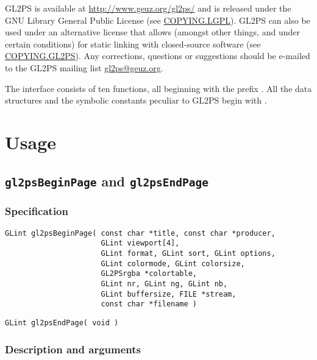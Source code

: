 \documentclass[10pt]{article}
\newcommand{\dd}{\begingroup\Url}
\newcommand{\email}[2]{\href{mailto:#2}{#1}}
\begin{document}
GL2PS is available at \url{http://www.geuz.org/gl2ps/} and is released under
the GNU Library General Public License (see
\href{http://www.geuz.org/gl2ps/COPYING.LGPL}{COPYING.LGPL}). GL2PS can also
be used under an alternative license that allows (amongst other things, and
under certain conditions) for static linking with closed-source software
(see \href{http://www.geuz.org/gl2ps/COPYING.GL2PS}{COPYING.GL2PS}). Any
corrections, questions or suggestions should be e-mailed to the GL2PS
mailing list \email{gl2ps@geuz.org}{gl2ps@geuz.org}.

The interface consists of ten functions, all beginning with the prefix
\dd{gl2ps}. All the data structures and the symbolic constants peculiar to
GL2PS begin with \dd{GL2PS}.

\section{Usage}


\subsection{\texttt{gl2psBeginPage} and \texttt{gl2psEndPage}}
\label{sec:gl2psBeginPage}

\subsubsection{Specification}

\begin{verbatim}
GLint gl2psBeginPage( const char *title, const char *producer,
                      GLint viewport[4],
                      GLint format, GLint sort, GLint options, 
                      GLint colormode, GLint colorsize, 
                      GL2PSrgba *colortable, 
                      GLint nr, GLint ng, GLint nb, 
                      GLint buffersize, FILE *stream,
                      const char *filename )
\end{verbatim}

\begin{verbatim}
GLint gl2psEndPage( void )
\end{verbatim}

\subsubsection{Description and arguments}
\end{document}
